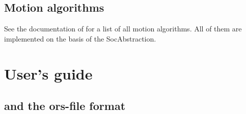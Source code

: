 \subsection{Motion algorithms}

See the documentation of  for a list of all motion
algorithms. All of them are implemented on the basis of the
SocAbstraction.




\section{User's guide}

\subsection{ and the ors-file format}

